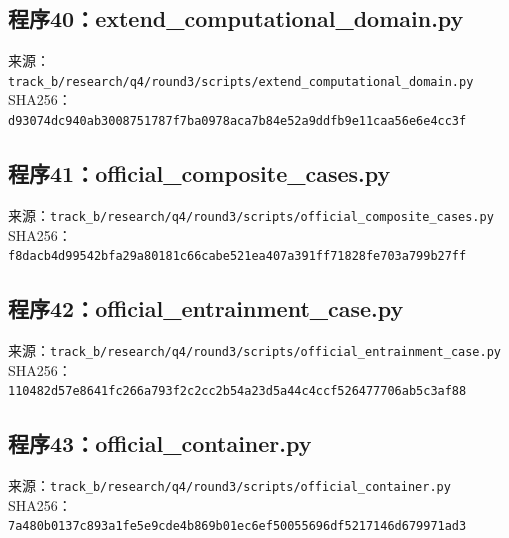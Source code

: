 \subsection*{程序40：extend\_computational\_domain.py}
\noindent 来源：\nolinkurl{track_b/research/q4/round3/scripts/extend_computational_domain.py}\\
\noindent SHA256：\texttt{d93074dc940ab3008751787f7ba0978a}\allowbreak\texttt{ca7b84e52a9ddfb9e11caa56e6e4cc3f}\\
\clearpage
\subsection*{程序41：official\_composite\_cases.py}
\noindent 来源：\nolinkurl{track_b/research/q4/round3/scripts/official_composite_cases.py}\\
\noindent SHA256：\texttt{f8dacb4d99542bfa29a80181c66cabe5}\allowbreak\texttt{21ea407a391ff71828fe703a799b27ff}\\
\clearpage
\subsection*{程序42：official\_entrainment\_case.py}
\noindent 来源：\nolinkurl{track_b/research/q4/round3/scripts/official_entrainment_case.py}\\
\noindent SHA256：\texttt{110482d57e8641fc266a793f2c2cc2b5}\allowbreak\texttt{4a23d5a44c4ccf526477706ab5c3af88}\\
\clearpage
\subsection*{程序43：official\_container.py}
\noindent 来源：\nolinkurl{track_b/research/q4/round3/scripts/official_container.py}\\
\noindent SHA256：\texttt{7a480b0137c893a1fe5e9cde4b869b01}\allowbreak\texttt{ec6ef50055696df5217146d679971ad3}\\
\clearpage
